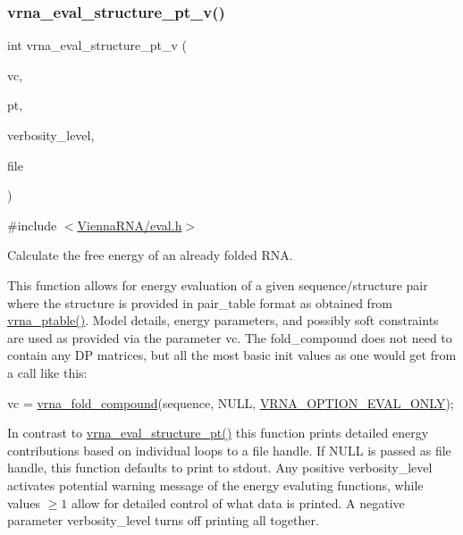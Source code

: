 \subsubsection{\texorpdfstring{vrna\+\_\+eval\+\_\+structure\+\_\+pt\+\_\+v()}{vrna\_eval\_structure\_pt\_v()}}
{\footnotesize\ttfamily int vrna\+\_\+eval\+\_\+structure\+\_\+pt\+\_\+v (\begin{DoxyParamCaption}\item[{\hyperlink{group__fold__compound_ga1b0cef17fd40466cef5968eaeeff6166}{vrna\+\_\+fold\+\_\+compound\+\_\+t} $\ast$}]{vc,  }\item[{const short $\ast$}]{pt,  }\item[{int}]{verbosity\+\_\+level,  }\item[{F\+I\+LE $\ast$}]{file }\end{DoxyParamCaption})}



{\ttfamily \#include $<$\hyperlink{eval_8h}{Vienna\+R\+N\+A/eval.\+h}$>$}



Calculate the free energy of an already folded R\+NA. 

This function allows for energy evaluation of a given sequence/structure pair where the structure is provided in pair\+\_\+table format as obtained from \hyperlink{group__struct__utils__pair__table_gae829fb8bb7f694c12a9c0bbc34c77c60}{vrna\+\_\+ptable()}. Model details, energy parameters, and possibly soft constraints are used as provided via the parameter \textquotesingle{}vc\textquotesingle{}. The fold\+\_\+compound does not need to contain any DP matrices, but all the most basic init values as one would get from a call like this\+: 
\begin{DoxyCode}
vc = \hyperlink{group__fold__compound_ga6601d994ba32b11511b36f68b08403be}{vrna\_fold\_compound}(sequence, NULL, \hyperlink{group__fold__compound_ga61469c423131552c8483229f8b6c7e0e}{VRNA\_OPTION\_EVAL\_ONLY});
\end{DoxyCode}
 In contrast to \hyperlink{group__eval_gadbd09372ddfd7a450bbd590c96a6bfe4}{vrna\+\_\+eval\+\_\+structure\+\_\+pt()} this function prints detailed energy contributions based on individual loops to a file handle. If N\+U\+LL is passed as file handle, this function defaults to print to stdout. Any positive {\ttfamily verbosity\+\_\+level} activates potential warning message of the energy evaluting functions, while values $ \ge 1 $ allow for detailed control of what data is printed. A negative parameter {\ttfamily verbosity\+\_\+level} turns off printing all together.

